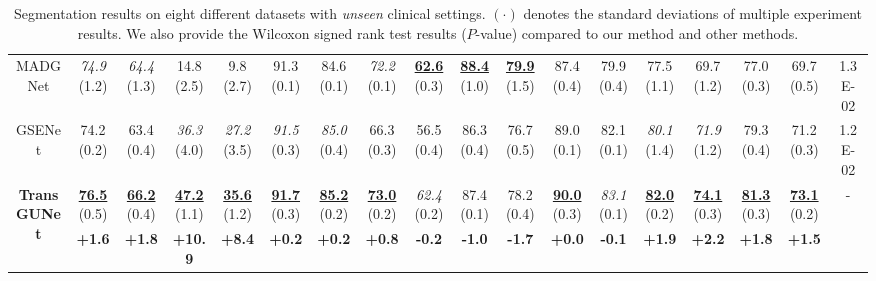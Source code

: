 \begin{table*}[t]
\begin{tabular}{c|cc|cc|cc|cc|cc|cc|cc|cc|c}
     MADGNet \cite{nam2024modality}           & \textit{74.9} \tiny{(1.2)} & \textit{64.4} \tiny{(1.3)} & 14.8 \tiny{(2.5)} & 9.8 \tiny{(2.7)} & 91.3 \tiny{(0.1)}  & 84.6 \tiny{(0.1)} & \textit{72.2} \tiny{(0.1)} & \textbf{\underline{62.6}} \tiny{(0.3)} & \textbf{\underline{88.4}} \tiny{(1.0)} & \textbf{\underline{79.9}} \tiny{(1.5)} & 87.4 \tiny{(0.4)} & 79.9 \tiny{(0.4)} & 77.5 \tiny{(1.1)} & 69.7 \tiny{(1.2)} & 77.0 \tiny{(0.3)} & 69.7 \tiny{(0.5)} & 1.3E-02 \\ 
     GSENet \cite{li2025gse} & 74.2 \tiny{(0.2)} & 63.4 \tiny{(0.4)} & \textit{36.3} \tiny{(4.0)} & \textit{27.2} \tiny{(3.5)} & \textit{91.5} \tiny{(0.3)} & \textit{85.0} \tiny{(0.4)} & 66.3 \tiny{(0.3)} & 56.5 \tiny{(0.4)} & 86.3 \tiny{(0.4)} & 76.7 \tiny{(0.5)} & 89.0 \tiny{(0.1)} & 82.1 \tiny{(0.1)} & \textit{80.1} \tiny{(1.4)} & \textit{71.9} \tiny{(1.2)} & 79.3 \tiny{(0.4)} & 71.2 \tiny{(0.3)}  & 1.2E-02 \\
     \hline
     \multicolumn{1}{c|}{\multirow{2}{*}{\textbf{TransGUNet}}} & \textbf{\underline{76.5}} \tiny{(0.5)} & \textbf{\underline{66.2}} \tiny{(0.4)} & \textbf{\underline{47.2}} \tiny{(1.1)} & \textbf{\underline{35.6}} \tiny{(1.2)} & \textbf{\underline{91.7}} \tiny{(0.3)} & \textbf{\underline{85.2}} \tiny{(0.2)} & \textbf{\underline{73.0}} \tiny{(0.2)} & \textit{62.4} \tiny{(0.2)} & 87.4 \tiny{(0.1)} & 78.2 \tiny{(0.4)} & \textbf{\underline{90.0}} \tiny{(0.3)} & \textit{83.1} \tiny{(0.1)} & \textbf{\underline{82.0}} \tiny{(0.2)} & \textbf{\underline{74.1}} \tiny{(0.3)} & \textbf{\underline{81.3}} \tiny{(0.3)} & \textbf{\underline{73.1}} \tiny{(0.2)} & \multicolumn{1}{c}{\multirow{2}{*}{-}} \\ \cline{2-17}
      & \textbf{+1.6} & \textbf{+1.8} & \textbf{+10.9} & \textbf{+8.4} & \textbf{+0.2} & \textbf{+0.2} & \textbf{+0.8} & \textbf{-0.2} & \textbf{-1.0} & \textbf{-1.7} & \textbf{+0.0} & \textbf{-0.1} & \textbf{+1.9} & \textbf{+2.2} & \textbf{+1.8} & \textbf{+1.5} & \\
    \hline
    \end{tabular}
    \caption{Segmentation results on eight different datasets with \textit{unseen} clinical settings. $(\cdot)$ denotes the standard deviations of multiple experiment results. We also provide the Wilcoxon signed rank test results ($P$-value) compared to our method and other methods.}
    \label{tab:comparison_sota_out_domain}
\end{table*}